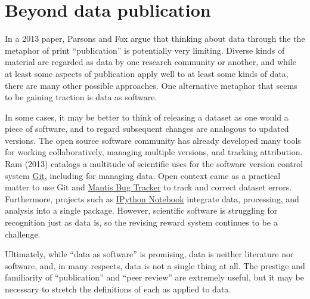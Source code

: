 \documentclass[10pt,a4paper,twocolumn]{article}
\begin{document}

\section*{Beyond data publication}\label{beyond-data-publication}

In a 2013 paper, Parsons and Fox\cite{parsons_is_2013} argue that thinking about data through the the metaphor of print ``publication'' is potentially very limiting.
Diverse kinds of material are regarded as data by one research community or another, and while at least some aspects of publication apply well to at least some kinds of data, there are many other possible approaches.
One alternative metaphor that seems to be gaining traction is data as software.\cite{schopf_treating_2012}

In some cases, it may be better to think of releasing a dataset as one would a piece of software, and to regard subsequent changes are analogous to updated versions.
The open source software community has already developed many tools for working collaboratively, managing multiple versions, and tracking attribution.
Ram (2013)\cite{ram_git_2013} catalogs a multitude of scientific uses for the software version control system \href{http://git-scm.com/}{Git}, including for managing data.
Open context came as a practical matter to use Git and \href{http://www.mantisbt.org/}{Mantis Bug Tracker} to track and correct dataset errors.
Furthermore, projects such as \href{http://ipython.org/notebook}{IPython Notebook} integrate data, processing, and analysis into a single package.
However, scientific software is struggling for recognition\cite{pradal_publishing_2013} just as data is, so the revising reward system continues to be a challenge.

Ultimately, while ``data as software'' is promising, data is neither literature nor software, and, in many respects, data is not a single thing at all.
The prestige and familiarity of ``publication'' and ``peer review'' are extremely useful, but it may be necessary to stretch the definitions of each as applied to data.


\nocite{*}
{\small
}



\end{document}
